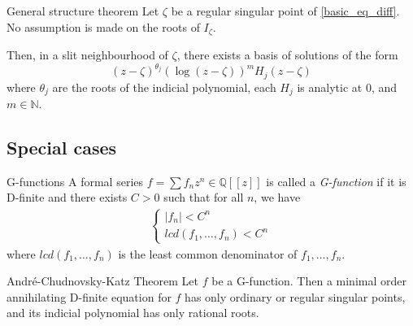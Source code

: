 \documentclass[../main.tex]{subfiles}
\begin{document}
\begin{thm}{General structure theorem}
	Let $\zeta$ be a regular singular point of \eqref{basic_eq_diff}. No assumption is made on the roots of $I_\zeta$.
	
	Then, in a slit neighbourhood of $\zeta$, there exists a basis of solutions of the form
	\begin{equation}\label{general_structure_form}
	{(z - \zeta)}^{\theta_j} {(\log (z - \zeta))}^m H_j (z - \zeta)
	\end{equation}
	where $\theta_j$ are the roots of the indicial polynomial, each $H_j$ is analytic at 0, and $m \in \mathbb{N}$. 
\end{thm}

\subsection{Special cases}

\begin{definition}{G-functions}
	A formal series $f = \sum f_n z^n \in \mathbb{Q}[[z]]$ is called a \emph{G-function} if it is D-finite and there exists $C > 0$ such that for all $n$, we have
	\begin{align*}
	\begin{cases}
	|f_n| < C^n\\
	lcd(f_1, \dots, f_n) < C^n
	\end{cases}
	\end{align*}
	where $lcd(f_1, \dots, f_n)$ is the least common denominator of $f_1, \dots, f_n$.
\end{definition}

\begin{thm}{André-Chudnovsky-Katz Theorem}
	Let $f$ be a G-function. Then a minimal order annihilating D-finite equation for $f$ has only ordinary or regular singular points, and its indicial polynomial has only rational roots.
\end{thm}




\end{document}
